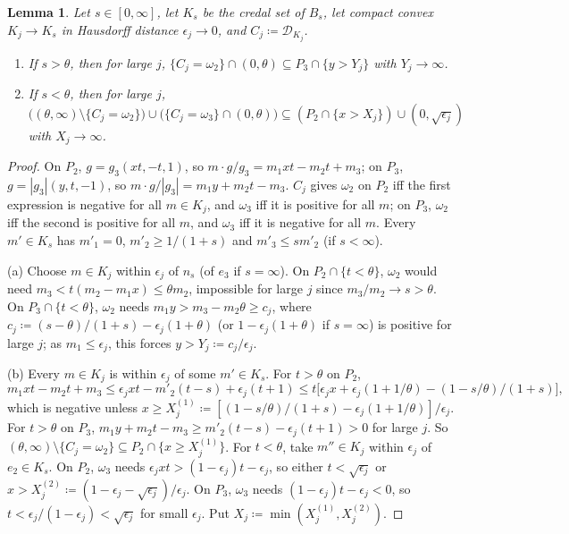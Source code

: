 \documentclass[11pt]{article}
\newtheorem{lemma}[theorem]{Lemma}
\theoremstyle{definition}\newtheorem{definition}[theorem]{Definition}
\theoremstyle{remark}\newtheorem{remark}[theorem]{Remark}
\newcommand{\Dscr}{\mathcal D}
\begin{document}
\begin{lemma}\label{lem:deviation}
Let $s\in[0,\infty]$, let $K_s$ be the credal set of $B_s$, let compact convex
$K_j\to K_s$ in Hausdorff distance $\epsilon_j\to0$, and $C_j\coloneqq
\Dscr_{K_j}$.
\begin{enumerate}[label=(\alph*)]
\item If $s>\theta$, then for large $j$, $\{C_j=\omega_2\}\cap(0,\theta)
\subseteq P_3\cap\{y>Y_j\}$ with $Y_j\to\infty$.
\item If $s<\theta$, then for large $j$,
$\bigl((\theta,\infty)\setminus\{C_j=\omega_2\}\bigr)\cup\bigl(\{C_j=\omega_3\}
\cap(0,\theta)\bigr)\subseteq(P_2\cap\{x>X_j\})\cup(0,\sqrt{\epsilon_j})$
with $X_j\to\infty$.
\end{enumerate}
\end{lemma}
\begin{proof}
On $P_2$, $g=g_3(xt,-t,1)$, so $m\cdot g/g_3=m_1xt-m_2t+m_3$; on $P_3$,
$g=|g_3|(y,t,-1)$, so $m\cdot g/|g_3|=m_1y+m_2t-m_3$. $C_j$ gives $\omega_2$
on $P_2$ iff the first expression is negative for all $m\in K_j$, and
$\omega_3$ iff it is positive for all $m$; on $P_3$, $\omega_2$ iff the second
is positive for all $m$, and $\omega_3$ iff it is negative for all $m$. Every
$m'\in K_s$ has $m'_1=0$, $m'_2\ge1/(1+s)$ and $m'_3\le sm'_2$ (if
$s<\infty$).

(a) Choose $m\in K_j$ within $\epsilon_j$ of $n_s$ (of $e_3$ if $s=\infty$).
On $P_2\cap\{t<\theta\}$, $\omega_2$ would need $m_3<t(m_2-m_1x)\le\theta m_2$,
impossible for large $j$ since $m_3/m_2\to s>\theta$. On
$P_3\cap\{t<\theta\}$, $\omega_2$ needs $m_1y>m_3-m_2\theta\ge c_j$, where
$c_j\coloneqq(s-\theta)/(1+s)-\epsilon_j(1+\theta)$ (or
$1-\epsilon_j(1+\theta)$ if $s=\infty$) is positive for large $j$; as
$m_1\le\epsilon_j$, this forces $y>Y_j\coloneqq c_j/\epsilon_j$.

(b) Every $m\in K_j$ is within $\epsilon_j$ of some $m'\in K_s$. For
$t>\theta$ on $P_2$,
\[
 m_1xt-m_2t+m_3\le\epsilon_jxt-m'_2(t-s)+\epsilon_j(t+1)\le
 t\bigl[\epsilon_jx+\epsilon_j(1+1/\theta)-(1-s/\theta)/(1+s)\bigr],
\]
which is negative unless $x\ge X_j^{(1)}\coloneqq[(1-s/\theta)/(1+s)-
\epsilon_j(1+1/\theta)]/\epsilon_j$. For $t>\theta$ on $P_3$,
$m_1y+m_2t-m_3\ge m'_2(t-s)-\epsilon_j(t+1)>0$ for large $j$. So
$(\theta,\infty)\setminus\{C_j=\omega_2\}\subseteq P_2\cap\{x\ge X_j^{(1)}\}$.
For $t<\theta$, take $m''\in K_j$ within $\epsilon_j$ of $e_2\in K_s$. On
$P_2$, $\omega_3$ needs $\epsilon_jxt>(1-\epsilon_j)t-\epsilon_j$, so either
$t<\sqrt{\epsilon_j}$ or $x>X_j^{(2)}\coloneqq(1-\epsilon_j-
\sqrt{\epsilon_j})/\epsilon_j$. On $P_3$, $\omega_3$ needs
$(1-\epsilon_j)t-\epsilon_j<0$, so $t<\epsilon_j/(1-\epsilon_j)<
\sqrt{\epsilon_j}$ for small $\epsilon_j$. Put
$X_j\coloneqq\min(X_j^{(1)},X_j^{(2)})$.
\end{proof}
\end{document}
